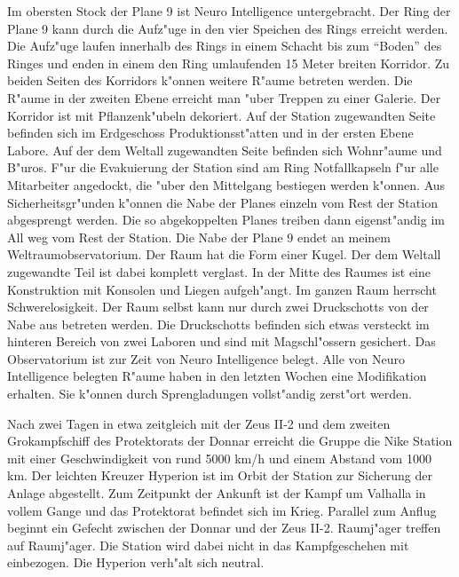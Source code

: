 Im obersten Stock der Plane 9 ist Neuro Intelligence untergebracht. Der Ring der Plane 9 kann durch die Aufz"uge in den vier Speichen des Rings erreicht werden. Die Aufz"uge laufen innerhalb des Rings in einem Schacht bis zum "`Boden"' des Ringes und enden in einem den Ring umlaufenden 15 Meter breiten Korridor. Zu beiden Seiten des Korridors k"onnen weitere R"aume betreten werden. Die R"aume in der zweiten Ebene erreicht man "uber Treppen zu einer Galerie. Der Korridor ist mit Pflanzenk"ubeln dekoriert. Auf der Station zugewandten Seite befinden sich im Erdgeschoss Produktionsst"atten und in der ersten Ebene Labore. Auf der dem Weltall zugewandten Seite befinden sich Wohnr"aume und B"uros. F"ur die Evakuierung der Station sind am Ring Notfallkapseln f"ur alle Mitarbeiter angedockt, die "uber den Mittelgang bestiegen werden k"onnen. Aus Sicherheitsgr"unden k"onnen die Nabe der Planes einzeln vom Rest der Station abgesprengt werden. Die so abgekoppelten Planes treiben dann eigenst"andig im All weg vom Rest der Station. Die Nabe der Plane 9 endet an meinem Weltraumobservatorium. Der Raum hat die Form einer Kugel. Der dem Weltall zugewandte Teil ist dabei komplett verglast. In der Mitte des Raumes ist eine Konstruktion mit Konsolen und Liegen aufgeh"angt. Im ganzen Raum herrscht Schwerelosigkeit. Der Raum selbst kann nur durch zwei Druckschotts von der Nabe aus betreten werden. Die Druckschotts befinden sich etwas versteckt im hinteren Bereich von zwei Laboren und sind mit Magschl"ossern gesichert. Das Observatorium ist zur Zeit von Neuro Intelligence belegt. Alle von Neuro Intelligence belegten R"aume haben in den letzten Wochen eine Modifikation erhalten. Sie k"onnen durch Sprengladungen vollst"andig zerst"ort werden.



Nach zwei Tagen in etwa zeitgleich mit der Zeus II-2 und dem zweiten Gro\3kampfschiff des Protektorats der Donnar erreicht die Gruppe die Nike Station mit einer Geschwindigkeit von rund 5000 km/h und einem Abstand vom 1000 km. Der leichten Kreuzer Hyperion ist im Orbit der Station zur Sicherung der Anlage abgestellt. Zum Zeitpunkt der Ankunft ist der Kampf um Valhalla in vollem Gange und das Protektorat befindet sich im Krieg. Parallel zum Anflug beginnt ein Gefecht zwischen der Donnar und der Zeus II-2. Raumj"ager treffen auf Raumj"ager. Die Station wird dabei nicht in das Kampfgeschehen mit einbezogen. Die Hyperion verh"alt sich neutral.


